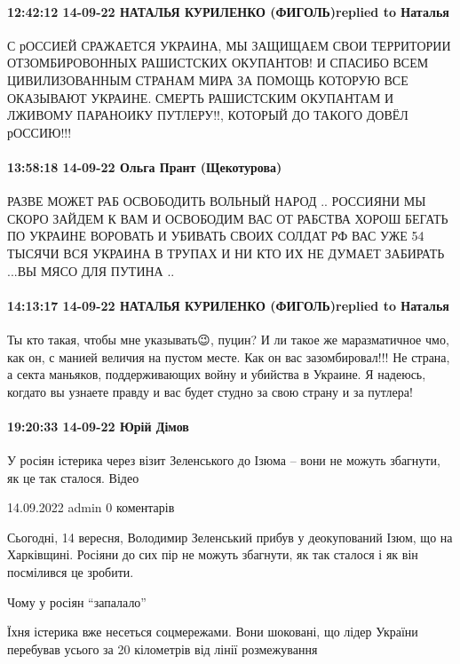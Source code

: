 \paragraph{12:42:12 14-09-22 НАТАЛЬЯ КУРИЛЕНКО (ФИГОЛЬ)replied to Наталья}

С рОССИЕЙ СРАЖАЕТСЯ УКРАИНА, МЫ ЗАЩИЩАЕМ СВОИ ТЕРРИТОРИИ ОТЗОМБИРОВОННЫХ РАШИСТСКИХ ОКУПАНТОВ! И СПАСИБО ВСЕМ ЦИВИЛИЗОВАННЫМ СТРАНАМ МИРА ЗА ПОМОЩЬ КОТОРУЮ ВСЕ ОКАЗЫВАЮТ УКРАИНЕ.
СМЕРТЬ РАШИСТСКИМ ОКУПАНТАМ И ЛЖИВОМУ ПАРАНОИКУ ПУТЛЕРУ!!, КОТОРЫЙ ДО ТАКОГО ДОВЁЛ рОССИЮ!!!

\paragraph{13:58:18 14-09-22 Ольга Прант (Щекотурова)}

РАЗВЕ МОЖЕТ РАБ ОСВОБОДИТЬ ВОЛЬНЫЙ НАРОД .. РОССИЯНИ МЫ СКОРО ЗАЙДЕМ К ВАМ И ОСВОБОДИМ ВАС ОТ РАБСТВА ХОРОШ БЕГАТЬ ПО УКРАИНЕ ВОРОВАТЬ И УБИВАТЬ СВОИХ СОЛДАТ РФ ВАС УЖЕ 54 ТЫСЯЧИ ВСЯ УКРАИНА В ТРУПАХ И НИ КТО ИХ НЕ ДУМАЕТ ЗАБИРАТЬ ...ВЫ МЯСО ДЛЯ ПУТИНА ..

\paragraph{14:13:17 14-09-22 НАТАЛЬЯ КУРИЛЕНКО (ФИГОЛЬ)replied to Наталья}

Ты кто такая, чтобы мне указывать😉, пуцин? И ли такое же маразматичное чмо, как он, с манией величия на пустом месте.
Как он вас зазомбировал!!!
Не страна, а секта маньяков, поддерживающих войну и убийства в Украине.
Я надеюсь, когдато вы узнаете правду и вас будет студно за свою страну и за путлера!

\paragraph{19:20:33 14-09-22 Юрій Дімов}

У росіян істерика через візит Зеленського до Ізюма – вони не можуть збагнути, як це так сталося. Відео

 14.09.2022 admin 0 коментарів

Сьогодні, 14 вересня, Володимир Зеленський прибув у деокупований Ізюм, що на Харківщині. Росіяни до сих пір не можуть збагнути, як так сталося і як він посмілився це зробити.

Чому у росіян “запалало”

Їхня істерика вже несеться соцмережами. Вони шоковані, що лідер України перебував усього за 20 кілометрів від лінії розмежування

